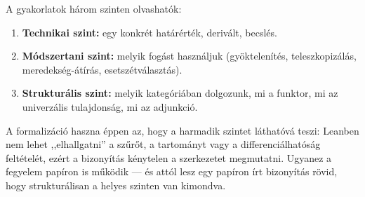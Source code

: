 \documentclass[11pt,a4paper]{article}
\theoremstyle{definition}
\begin{document}
A gyakorlatok három szinten olvashatók:
\begin{enumerate}[nosep]
  \item \textbf{Technikai szint:} egy konkrét határérték, derivált, becslés.
  \item \textbf{Módszertani szint:} melyik fogást használjuk (gyöktelenítés,
        teleszkopizálás, meredekség-átírás, esetszétválasztás).
  \item \textbf{Strukturális szint:} melyik kategóriában dolgozunk, mi a
        funktor, mi az univerzális tulajdonság, mi az adjunkció.
\end{enumerate}
A formalizáció haszna éppen az, hogy a harmadik szintet láthatóvá teszi:
Leanben nem lehet ,,elhallgatni'' a szűrőt, a tartományt vagy a
differenciálhatóság feltételét, ezért a bizonyítás kénytelen a szerkezetet
megmutatni. Ugyanez a fegyelem papíron is működik --- és attól lesz egy
papíron írt bizonyítás rövid, hogy strukturálisan a helyes szinten van kimondva.
\end{document}
